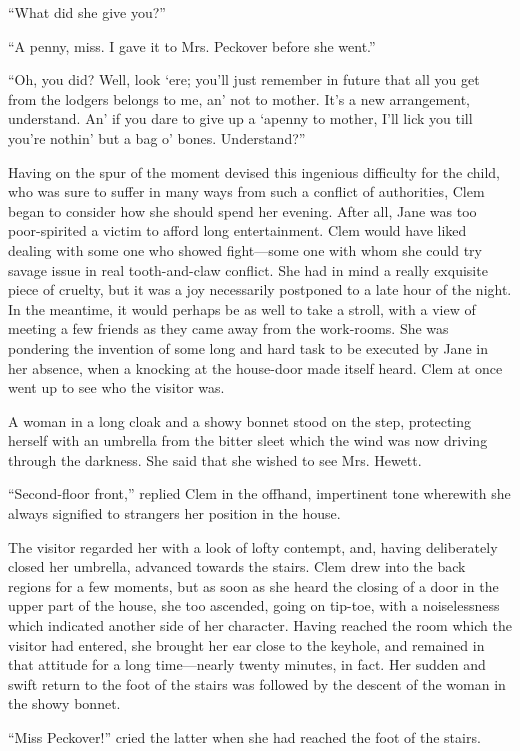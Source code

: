 ``What did she give you?''

``A penny, miss. I gave it to Mrs. Peckover before she went.''

``Oh, you did? Well, look `ere; you'll just remember in future that all
you get from the lodgers belongs to me, an' not to mother. It's a new
arrangement, understand. An' if you dare to give up a `apenny to mother,
I'll lick you till you're nothin' but a bag o' bones. Understand?''

Having on the spur of the moment devised this ingenious difficulty for
the child, who was sure to suffer in many ways from such a conflict of
authorities, Clem began to consider how she should spend her evening.
After all, Jane was too poor-spirited a victim to afford long
entertainment. Clem would have liked dealing with some one who showed
fight---some one with whom she could try savage issue in real
tooth-and-claw conflict. She had in mind a really exquisite piece {}of
cruelty, but it was a joy necessarily postponed to a late hour of the
night. In the meantime, it would perhaps be as well to take a stroll,
with a view of meeting a few friends as they came away from the
work-rooms. She was pondering the invention of some long and hard task
to be executed by Jane in her absence, when a knocking at the house-door
made itself heard. Clem at once went up to see who the visitor was.

A woman in a long cloak and a showy bonnet stood on the step, protecting
herself with an umbrella from the bitter sleet which the wind was now
driving through the darkness. She said that she wished to see Mrs.
Hewett.

``Second-floor front,'' replied Clem in the offhand, impertinent tone
wherewith she always signified to strangers her position in the house.

The visitor regarded her with a look of lofty contempt, and, having
deliberately closed her umbrella, advanced towards the stairs. Clem drew
into the back regions for {}a few moments, but as soon as she heard the
closing of a door in the upper part of the house, she too ascended,
going on tip-toe, with a noiselessness which indicated another side of
her character. Having reached the room which the visitor had entered,
she brought her ear close to the keyhole, and remained in that attitude
for a long time---nearly twenty minutes, in fact. Her sudden and swift
return to the foot of the stairs was followed by the descent of the
woman in the showy bonnet.

``Miss Peckover!'' cried the latter when she had reached the foot of the
stairs.

